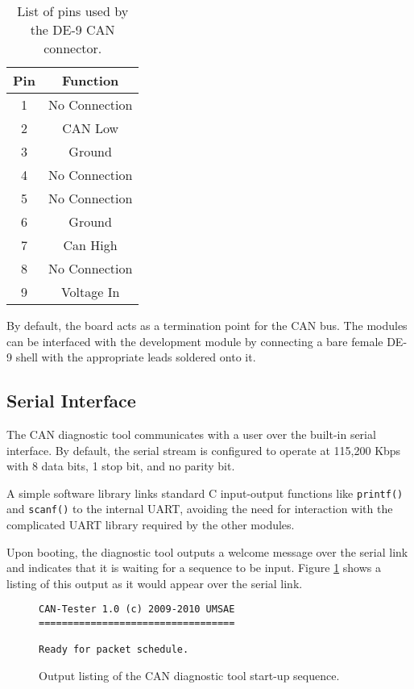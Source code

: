 \begin{table}[H]
  \caption{List of pins used by the DE-9 CAN connector.}
  \centering
  \begin{tabular}{|c|c|}
    \hline 
    Pin & Function \\
    \hline \hline
    1 & No Connection\\
    \hline    
    2 & CAN Low\\
    \hline    
    3 & Ground\\
    \hline    
    4 & No Connection\\
    \hline    
    5 & No Connection\\
    \hline    
    6 & Ground\\
    \hline    
    7 & Can High\\                 
    \hline    
    8 & No Connection\\
    \hline
    9 & Voltage In\\        
    \hline
  \end{tabular}
  \label{tbl:candt_pins}
\end{table}

By default, the board acts as a termination point for the CAN bus. The modules can be interfaced with the development module by connecting a bare female DE-9 shell with the appropriate leads soldered onto it. 

\subsection{Serial Interface}

The CAN diagnostic tool communicates with a user over the built-in serial interface. By default, the serial stream is configured to operate at 115,200 Kbps with 8 data bits, 1 stop bit, and no parity bit.

A simple software library links standard C input-output functions like \verb|printf()| and \verb|scanf()| to the internal UART, avoiding the need for interaction with the complicated UART library required by the other modules. 

Upon booting, the diagnostic tool outputs a welcome message over the serial link and indicates that it is waiting for a sequence to be input. Figure \ref{fig:candt_startup} shows a listing of this output as it would appear over the serial link.

\begin{figure}[H]
	\centering
	\makebox[\textwidth]{\hrulefill}
{\footnotesize	
	\begin{verbatim}
CAN-Tester 1.0 (c) 2009-2010 UMSAE
==================================

Ready for packet schedule.
	\end{verbatim}
}	
	\makebox[\textwidth]{\hrulefill}
	\caption{Output listing of the CAN diagnostic tool start-up sequence.}
	\label{fig:candt_startup}
\end{figure}

